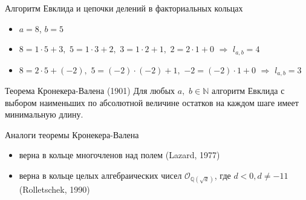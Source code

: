 \documentclass[8pt, xcolor=x11names]{beamer}
\begin{document}
\begin{frame}
    \begin{block}{Алгоритм Евклида и цепочки делений в факториальных кольцах}
        \begin{itemize}
            \item $a = 8$, $b = 5$
            
            \item $8 = 1\cdot 5 + 3,$ $5 =  1\cdot 3+2,$ $3=1\cdot 2+1,$ $2=2\cdot 1+0$ $\Rightarrow$ $l_{a,b}=4$
            
            \item $8=2\cdot 5+(-2),$ $5=(-2)\cdot (-2)+1,$ $-2=(-2)\cdot 1+0$ $\Rightarrow$ $l_{a,b}=3$
        \end{itemize}
    \end{block}

    \begin{block}{Теорема Кронекера-Валена (1901)}
        Для любых $a,$ $b\in \mathbb{N}$ алгоритм Евклида с выбором наименьших по абсолютной величине остатков на каждом шаге имеет минимальную длину.
    \end{block}
    
    \begin{block}{Аналоги теоремы Кронекера-Валена}
        \begin{itemize}
            \item верна в кольце многочленов над полем (Lazard, 1977)
            
            \item верна в кольце целых алгебраических чисел $\mathcal{O}_{\mathbb{Q}(\sqrt{d})}$, где $d<0, d \neq -11$ (Rolletschek, 1990)
        \end{itemize}
    \end{block}
\end{frame}
\end{document}
